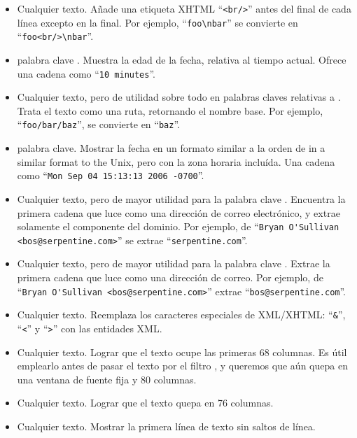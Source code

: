 {{\begin{itemize}
\item[\tplfilter{addbreaks}] Cualquier texto. Añade una etiqueta XHTML
  ``\Verb+<br/>+'' antes del final de cada línea excepto en la final.
  Por ejemplo, ``\Verb+foo\nbar+'' se convierte en ``\Verb+foo<br/>\nbar+''.
\item[\tplkwfilt{date}{age}] palabra clave .  Muestra
  la edad de la fecha, relativa al tiempo actual. Ofrece una cadena como
  ``\Verb+10 minutes+''.
\item[\tplfilter{basename}] Cualquier texto, pero de utilidad sobre
  todo en palabras claves relativas a .  Trata el
  texto como una ruta, retornando el nombre base.  Por ejemplo,
  ``\Verb+foo/bar/baz+'', se convierte en ``\Verb+baz+''.
\item[\tplkwfilt{date}{date}]  palabra clave.  Mostrar
  la fecha en un formato similar a la orden  de 
  in a similar format to the Unix, pero con la zona horaria incluída.
  Una cadena como ``\Verb+Mon Sep 04 15:13:13 2006 -0700+''.
\item[\tplkwfilt{author}{domain}] Cualquier texto, pero de mayor
  utilidad para la palabra clave .  Encuentra la
  primera cadena que luce como una dirección de correo electrónico, y
  extrae solamente el componente del dominio.  Por ejemplo, de 
  ``\Verb+Bryan O'Sullivan <bos@serpentine.com>+'' se extrae
  ``\Verb+serpentine.com+''.
\item[\tplkwfilt{author}{email}] Cualquier texto, pero de mayor
  utilidad para la palabra clave .  Extrae la primera
  cadena que luce como una dirección de correo. Por ejemplo, de
  ``\Verb+Bryan O'Sullivan <bos@serpentine.com>+'' extrae 
  ``\Verb+bos@serpentine.com+''.
\item[\tplfilter{escape}] Cualquier texto.  Reemplaza los caracteres
  especiales de XML/XHTML: ``\Verb+&+'', ``\Verb+<+'' y ``\Verb+>+''
  con las entidades XML.
\item[\tplfilter{fill68}] Cualquier texto. Lograr que el texto ocupe
  las primeras 68 columnas.  Es útil emplearlo antes de pasar el texto
  por el filtro , y queremos que aún quepa en una
  ventana de fuente fija y 80 columnas.
\item[\tplfilter{fill76}] Cualquier texto.  Lograr que el texto quepa
  en 76 columnas.
\item[\tplfilter{firstline}] Cualquier texto.  Mostrar la primera
  línea de texto sin saltos de línea.

\end{itemize}}}
